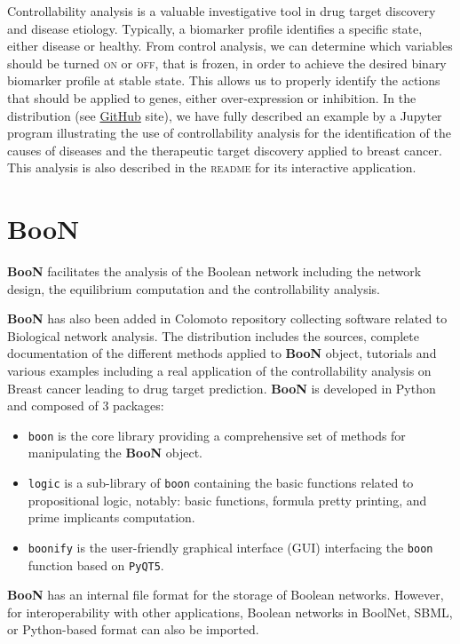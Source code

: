 \documentclass[numsec,webpdf,modern,large]{oup-authoring-template}
\newcommand{\boon}[0]{\textbf{BooN}\xspace}
\begin{document}
Controllability analysis is a valuable investigative tool in drug target discovery and disease etiology.
Typically, a biomarker profile identifies a specific state, either disease or healthy.
From control analysis, we can determine which variables should be turned \textsc{on} or \textsc{off}, that is frozen,  in order to achieve the desired binary biomarker profile at stable state.
	This allows us to properly identify the actions that should be applied to genes, either over-expression or inhibition. 
	In the distribution (see \href{https://github.com/Franck-Delaplace/BooN}{GitHub} site), we have fully described an example by a Jupyter program illustrating the use of controllability analysis for the identification of the causes of diseases and the  therapeutic target discovery applied to breast cancer. This analysis is also described in the \textsc{readme} for its interactive application.  

\section{\boon}
	\label{sec:boon}
	\boon facilitates the analysis of the Boolean network including the network design, the equilibrium computation and the controllability analysis.

	\boon has also been added in Colomoto\citep{naldi2018} repository collecting software related to Biological network analysis.
	 The distribution includes the sources, complete documentation of the different methods applied to \boon object, tutorials and various examples including a real application of the controllability analysis on Breast cancer leading to drug target prediction. 
	  \boon is developed in Python and composed of $3$ packages:
	\begin{itemize}
		\item \texttt{boon} is the core library providing a comprehensive set of methods for manipulating the \boon object. 
		\item \texttt{logic} is a sub-library of \texttt{boon} containing the basic functions related to propositional logic, notably: basic functions, formula pretty printing, and prime implicants computation.
		\item \texttt{boonify} is the user-friendly graphical interface (GUI) interfacing the \texttt{boon} function based on  \texttt{PyQT5}.
	\end{itemize}
    \boon has an internal file format for the storage of Boolean networks.
    However, for interoperability with other applications, Boolean networks in BoolNet, SBML, or Python-based format can also be imported.
\end{document}
